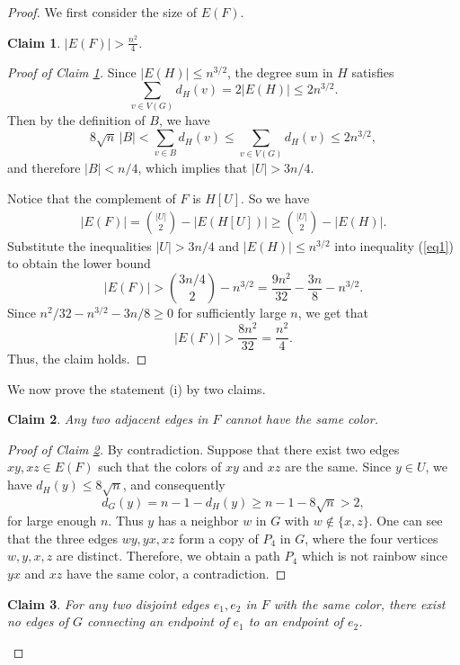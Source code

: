 \documentclass[11pt,a4paper]{article}
\newtheorem{claim}{Claim}
\begin{document}
\begin{proof}

We first consider the size of $E(F)$.

\begin{claim}\label{c4}
$|E(F)|>\frac{n^2}{4}$.
\end{claim}

\begin{proof}[Proof of Claim \ref{c4}]
Since $|E(H)|\le n^{3/2}$, the degree sum in $H$ satisfies
\[
\sum_{v\in V(G)}d_H(v)=2|E(H)|\le 2n^{3/2}.
\]
Then by the definition of $B$, we have
\[
8\sqrt n\,|B|<\sum_{v\in B}d_H(v)\le \sum_{v\in V(G)}d_H(v)\le 2n^{3/2},
\]
and therefore $|B|<n/4$, which implies that $|U|>3n/4$. 

Notice that the complement of $F$  is $H[U]$.  So we have
\begin{align}\label{eq1}
|E(F)|=\binom{|U|}{2}-|E(H[U])|
       \ge \binom{|U|}{2}-|E(H)|.
\end{align}
Substitute the inequalities $|U|>3n/4$ and $|E(H)|\le n^{3/2}$ into inequality (\ref{eq1}) to obtain the lower bound
\[
|E(F)|>\binom{3n/4}{2}-n^{3/2}
       =\frac{9n^2}{32}-\frac{3n}{8}-n^{3/2}.
\]
Since $n^2/32-n^{3/2}-3n/8\ge 0$ for  sufficiently large $n$,
we get that 
\[
|E(F)|> \frac{8n^2}{32}=\frac{n^2}{4}.
\]
Thus, the claim holds.
\end{proof}

We now prove the statement (i) by two claims. 

\begin{claim}\label{c1}
Any two adjacent edges in $F$ cannot have the same color. 
\end{claim}

\begin{proof}[Proof of Claim \ref{c1}]
By contradiction. 
Suppose that there exist two edges $xy,xz\in E(F)$ such that the colors of $xy$ and $xz$ are the same.  
Since $y\in U$, we have
$d_H(y)\le 8\sqrt n$, and consequently
\[
d_G(y)=n-1-d_H(y)\ge n-1-8\sqrt n>2,
\]
for large enough $n$. 
Thus $y$ has a neighbor $w$ in $G$ with $w\notin\{x,z\}$.  
One can see that the three edges $wy,yx,xz$ form a copy of $P_4$ in $G$, where the four vertices $w,y,x,z$ are distinct.  
Therefore, we obtain a path $P_4$ which  is not rainbow since $yx$ and $xz$ have the same color, a contradiction.  
\end{proof}


\begin{claim}\label{c2}
For any two disjoint edges  $e_1, e_2$ in $F$ with the same color, there exist no edges of $G$ connecting an endpoint of $e_1$ to an endpoint of $e_2$. 
\end{claim}


\end{proof}
\end{document}
